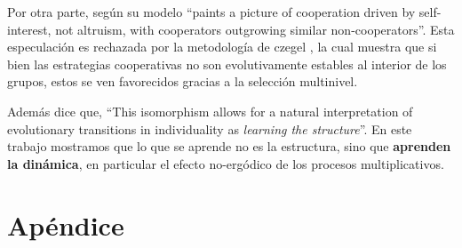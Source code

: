 \documentclass[a4paper,10pt]{article}
\begin{document}
Por otra parte, según \cite{peters} su modelo ``paints a picture of cooperation driven by self-interest, not altruism, with cooperators outgrowing similar non-cooperators''.
Esta especulación es rechazada por la metodología de czegel \cite{czegel2019-bayesianEvolution}, la cual muestra que si bien las estrategias cooperativas no son evolutivamente estables al interior de los grupos, estos se ven favorecidos gracias a la selección multinivel.

Además \cite{czegel2019-bayesianEvolution} dice que, ``This isomorphism allows for a natural interpretation of evolutionary transitions in individuality as \emph{learning the structure}''.
En este trabajo mostramos que lo que se aprende no es la estructura, sino que \textbf{aprenden la dinámica}, en particular el efecto no-ergódico de los procesos multiplicativos.



% 
{\footnotesize


}

\section{Apéndice}
\end{document}
